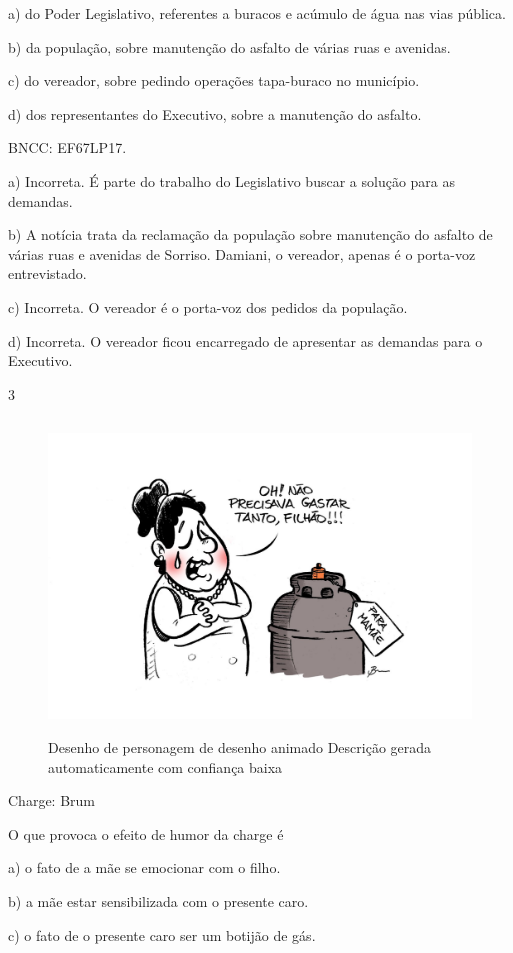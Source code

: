 a) do Poder Legislativo, referentes a buracos e acúmulo de água nas vias
pública.

b) da população, sobre manutenção do asfalto de várias ruas e avenidas.

c) do vereador, sobre pedindo operações tapa-buraco no município.

d) dos representantes do Executivo, sobre a manutenção do asfalto.

BNCC: EF67LP17.

a) Incorreta. É parte do trabalho do Legislativo buscar a solução para
as demandas.

b) A notícia trata da reclamação da população sobre manutenção do
asfalto de várias ruas e avenidas de Sorriso. Damiani, o vereador,
apenas é o porta-voz entrevistado.

c) Incorreta. O vereador é o porta-voz dos pedidos da população.

d) Incorreta. O vereador ficou encarregado de apresentar as demandas
para o Executivo.

\num{3}

\begin{figure}
\centering
\includegraphics[width=4.86098in,height=3.28333in]{./imgSAEB_6_POR/media/image39.png}
\caption{Desenho de personagem de desenho animado Descrição gerada
automaticamente com confiança baixa}
\end{figure}

Charge: Brum

O que provoca o efeito de humor da charge é

a) o fato de a mãe se emocionar com o filho.

b) a mãe estar sensibilizada com o presente caro.

c) o fato de o presente caro ser um botijão de gás.

